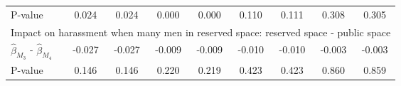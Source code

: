 \begin{tabular}{l*{8}{c}}
\quad P-value       &       0.024         &       0.024         &       0.000         &       0.000         &       0.110         &       0.111         &       0.308         &       0.305         \\
\multicolumn{9}{l}{Impact on harassment when many men in reserved space: reserved space - public space} \\\quad $\hat\beta_{M_3}$ - $\hat\beta_{M_4}$&      -0.027         &      -0.027         &      -0.009         &      -0.009         &      -0.010         &      -0.010         &      -0.003         &      -0.003         \\
\quad P-value       &       0.146         &       0.146         &       0.220         &       0.219         &       0.423         &       0.423         &       0.860         &       0.859         \\
\hline\hline \end{tabular}
